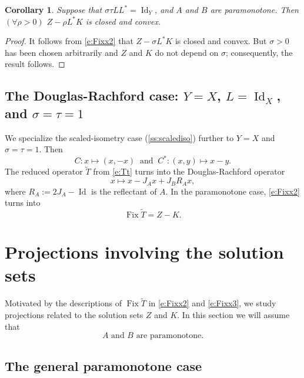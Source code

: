 \documentclass{article}
\newcommand{\Tt}{\ensuremath{\widetilde{T}}}
\newcommand{\Fix}{\ensuremath{\operatorname{Fix}}}
\newcommand{\Id}{\ensuremath{\operatorname{Id}}}
\newtheorem{corollary}[theorem]{Corollary}
\begin{document}
\begin{corollary}
\label{c:241127a}
Suppose that 
$\sigma\tau LL^*=\Id_Y$, and $A$ and $B$ are paramonotone. Then 
$(\forall \rho>0)$ $Z-\rho L^*K$ is closed and convex.
\end{corollary}
\begin{proof}
It follows from \cref{e:Fixx2} that 
$Z-\sigma L^*K$ is closed and convex.
But $\sigma>0$ has been chosen arbitrarily and $Z$ and $K$ do not depend on $\sigma$; consequently, the result follows. 
\end{proof}


\subsection{The Douglas-Rachford case: $Y=X$, $L=\Id_X$, and $\sigma=\tau=1$}

\label{ss:DR}

We specialize the scaled-isometry case (\cref{ss:scalediso}) further to 
$Y=X$ and $\sigma=\tau=1$. Then  
\begin{equation}
C \colon x\mapsto (x,-x)
\;\;\text{and}\;\;
C^* \colon (x,y)\mapsto x-y.
\end{equation}
The reduced operator $\Tt$ from \cref{e:Tt} turns into 
the Douglas-Rachford operator
\begin{equation}
x\mapsto x-J_Ax + J_BR_Ax,
\end{equation}
where $R_A:=2J_A-\Id$ is the reflectant of $A$. 
In the paramonotone case, 
\cref{e:Fixx2} turns into 
\begin{equation}
\label{e:Fixx3}
\Fix \Tt = Z-K.
\end{equation}


\section{Projections involving the solution sets}

\label{s:projsols}

Motivated by the descriptions of $\Fix\Tt$ in \cref{e:Fixx2} and \cref{e:Fixx3}, 
we study projections related to the solution sets $Z$ and $K$.
In this section we will assume that 
\begin{equation}
\text{$A$ and $B$ are paramonotone.}
\end{equation}


\subsection{The general paramonotone case}
\end{document}
